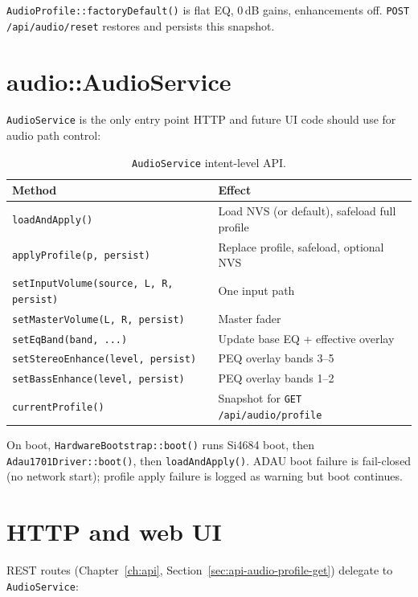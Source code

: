 \texttt{AudioProfile::factoryDefault()} is flat EQ, 0\,dB gains, enhancements
off. \texttt{POST /api/audio/reset} restores and persists this snapshot.

\section{audio::AudioService}
\label{sec:adau1701-service}

\texttt{AudioService} is the only entry point HTTP and future UI code should
use for audio path control:

\begin{table}[htbp]
  \centering
  \small
  \begin{tabular}{@{}L{4.2cm}L{9.2cm}@{}}
    \toprule
    \textbf{Method} & \textbf{Effect} \\
    \midrule
    \texttt{loadAndApply()} & Load NVS (or default), safeload full profile \\
    \texttt{applyProfile(p, persist)} & Replace profile, safeload, optional NVS \\
    \texttt{setInputVolume(source, L, R, persist)} & One input path \\
    \texttt{setMasterVolume(L, R, persist)} & Master fader \\
    \texttt{setEqBand(band, ...)} & Update base EQ + effective overlay \\
    \texttt{setStereoEnhance(level, persist)} & PEQ overlay bands 3--5 \\
    \texttt{setBassEnhance(level, persist)} & PEQ overlay bands 1--2 \\
    \texttt{currentProfile()} & Snapshot for \texttt{GET /api/audio/profile} \\
    \bottomrule
  \end{tabular}
  \caption{\texttt{AudioService} intent-level API.}
  \label{tab:adau1701-service}
\end{table}

On boot, \texttt{HardwareBootstrap::boot()} runs Si4684 boot, then
\texttt{Adau1701Driver::boot()}, then \texttt{loadAndApply()}. ADAU boot
failure is fail-closed (no network start); profile apply failure is logged as
warning but boot continues.

\section{HTTP and web UI}
\label{sec:adau1701-http}

REST routes (Chapter~\ref{ch:api}, Section~\ref{sec:api-audio-profile-get})
delegate to \texttt{AudioService}:

